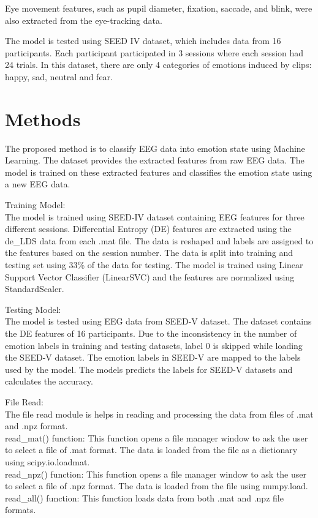 \documentclass[12pt, a4paper]{report}
\begin{document}
Eye movement features, such as pupil diameter, fixation, saccade, and blink, were also extracted from the eye-tracking data.

The model is tested using SEED IV dataset, which includes data from 16 participants. Each participant participated in 3 sessions where each session had 24 trials. In this dataset, there are only 4 categories of emotions induced by clips: happy, sad, neutral and fear.


\section{Methods}
The proposed method is to classify EEG data into emotion state using Machine Learning. The dataset provides the extracted features from raw EEG data. The model is trained on these extracted features and classifies the emotion state using a new EEG data.

Training Model:
\\ The model is trained using SEED-IV dataset containing EEG features for three different sessions. Differential Entropy (DE) features are extracted using the de\_LDS data from each .mat file. The data is reshaped and labels are assigned to the features based on the session number. The data is split into training and testing set using 33\% of the data for testing. The model is trained using Linear Support Vector Classifier (LinearSVC) and the features are normalized using StandardScaler.

Testing Model:
\\ The model is tested using EEG data from SEED-V dataset. The dataset contains the DE features of 16 participants. Due to the inconsistency in the number of emotion labels in training and testing datasets, label 0 is skipped while loading the SEED-V dataset. The emotion labels in SEED-V are mapped to the labels used by the model. The models predicts the labels for SEED-V datasets and calculates the accuracy.

File Read:
\\ The file read module is helps in reading and processing the data from files of .mat and .npz format. 
\\ read\_mat() function: This function opens a file manager window to ask the user to select a file of .mat format. The data is loaded from the file as a dictionary using scipy.io.loadmat. 
\\ read\_npz() function: This function opens a file manager window to ask the user to select a file of .npz format. The data is loaded from the file using numpy.load.
\\ read\_all() function: This function loads data from both .mat and .npz file formats.
\end{document}
